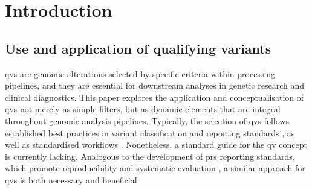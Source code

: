 
\section{Introduction}
\label{sec:intro}
\subsection{Use and application of qualifying variants}


\ac{qv}s are genomic alterations selected by specific criteria within processing pipelines, and they are essential for downstream analyses in genetic research and clinical diagnostics. This paper explores the application and conceptualisation of \ac{qv}s not merely as simple filters, but as dynamic elements that are integral throughout genomic analysis pipelines. Typically, the selection of \ac{qv}s follows established best practices in variant classification and reporting standards \cite{richards2015standards, li2017standards, li2017intervar, riggs2020technical, tavtigian2020fitting}, as well as standardised workflows \cite{pedersen2021effective, anderson2010data, uffelmann2021genome}. Nonetheless, a standard guide for the \ac{qv} concept is currently lacking. Analogous to the development of \ac{prs} reporting standards, which promote reproducibility and systematic evaluation \cite{wand2021improving, lambert2021polygenic}, a similar approach for \ac{qv}s is both necessary and beneficial.

